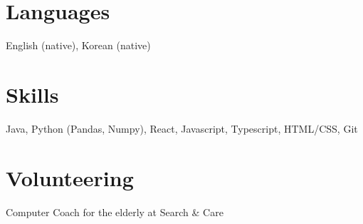 \documentclass[margin]{res}
\begin{document}
\begin{resume}
\section{Languages}
English (native), Korean (native)

\section{Skills} 
Java, Python (Pandas, Numpy), React, Javascript, Typescript, HTML/CSS, Git

\section{Volunteering}
Computer Coach for the elderly at Search \& Care

\end{resume} 
\end{document}
